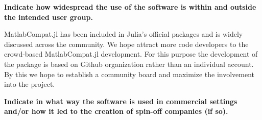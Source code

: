 \textbf{Indicate how widespread the use of the software is within and outside the intended user group.}

MatlabCompat.jl has been included in Julia's official packages and is widely discussed across the community. We hope attract more code developers to the crowd-based MatlabCompat.jl development. For this purpose the development of the package is based on Github organization rather than an individual account. By this we hope to establish a community board and maximize the involvement into the project.

\textbf{Indicate in what way the software is used in commercial settings and/or how it led to the creation of spin-off companies (if so).}

  
  
  